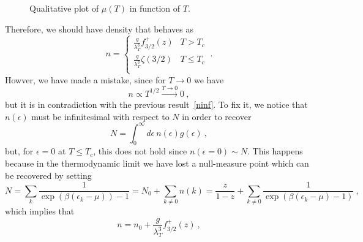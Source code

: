     \begin{figure}[h!]
        \centering
        \caption{Qualitative plot of $\mu(T)$ in function of $T$.}
        \label{fig:mu}
    \end{figure}

    Therefore, we should have density that behaves as 
    \begin{equation*}
        n = \begin{cases}
            \frac{g}{\lambda_T^3} f^+_{3/2} (z) & T > T_c \\
            \frac{g}{\lambda_T^3} \zeta(3/2) & T \leq T_c \\
        \end{cases} ~.
    \end{equation*}
    Howver, we have made a mistake, since for $T \rightarrow 0$ we have 
    \begin{equation*}
        n \propto T^{1/2} \xrightarrow{T \rightarrow 0} 0 ~,
    \end{equation*}
    but it is in contradiction with the previous result~\eqref{ninf}. To fix it, we notice that $n(\epsilon)$ must be infinitesimal with respect to $N$ in order to recover 
    \begin{equation*}
        N = \int_0^\infty d\epsilon ~ n(\epsilon) g(\epsilon) ~,
    \end{equation*}
    but, for $\epsilon = 0$ at $T \leq T_c$, this does not hold since $n(\epsilon = 0) \sim N$. This happens because in the thermodynamic limit we have lost a null-measure point which can be recovered by setting 
    \begin{equation*}
        N = \sum_k \frac{1}{\exp(\beta(\epsilon_k - \mu)) - 1} = N_0 + \sum_{k\neq 0} n(k) = \frac{z}{1 - z} + \sum_{k\neq 0} \frac{1}{\exp(\beta(\epsilon_k - \mu)-1) } ~,
    \end{equation*}
    which implies that 
    \begin{equation*}
        n = n_0 + \frac{g}{\lambda_T^3} f^+_{3/2} (z) ~,
    \end{equation*}
